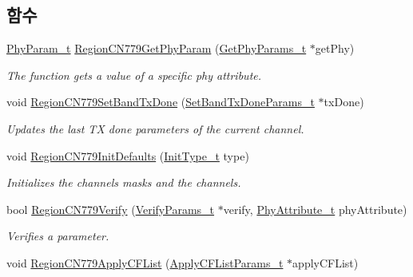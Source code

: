 \subsection*{함수}
\begin{DoxyCompactItemize}
\item 
\mbox{\hyperlink{group___r_e_g_i_o_n_gaed159b26e5c4677236b6e8677019db30}{Phy\+Param\+\_\+t}} \mbox{\hyperlink{group___r_e_g_i_o_n_c_n779_gab45c9a48b25622ab197ab8510cc7cbc0}{Region\+C\+N779\+Get\+Phy\+Param}} (\mbox{\hyperlink{group___r_e_g_i_o_n_gab471483fff904f4f89bbc03f7fc380ab}{Get\+Phy\+Params\+\_\+t}} $\ast$get\+Phy)
\begin{DoxyCompactList}\small\item\em The function gets a value of a specific phy attribute. \end{DoxyCompactList}\item 
void \mbox{\hyperlink{group___r_e_g_i_o_n_c_n779_gab7e1485f1112861ad7dae9801995a2c4}{Region\+C\+N779\+Set\+Band\+Tx\+Done}} (\mbox{\hyperlink{group___r_e_g_i_o_n_gad0524aa0673c0814a71e7a4f9cade3fc}{Set\+Band\+Tx\+Done\+Params\+\_\+t}} $\ast$tx\+Done)
\begin{DoxyCompactList}\small\item\em Updates the last TX done parameters of the current channel. \end{DoxyCompactList}\item 
void \mbox{\hyperlink{group___r_e_g_i_o_n_c_n779_ga85953f37b52567b54689c354671a14f6}{Region\+C\+N779\+Init\+Defaults}} (\mbox{\hyperlink{group___r_e_g_i_o_n_gaddc73ae10673ec925724e7870363bda9}{Init\+Type\+\_\+t}} type)
\begin{DoxyCompactList}\small\item\em Initializes the channels masks and the channels. \end{DoxyCompactList}\item 
bool \mbox{\hyperlink{group___r_e_g_i_o_n_c_n779_ga7108626b64685883842049a36d865208}{Region\+C\+N779\+Verify}} (\mbox{\hyperlink{group___r_e_g_i_o_n_ga966d97bc2f25df1c09e92e60ef652276}{Verify\+Params\+\_\+t}} $\ast$verify, \mbox{\hyperlink{group___r_e_g_i_o_n_ga9445b07fdf77581ecfaf389970e635f8}{Phy\+Attribute\+\_\+t}} phy\+Attribute)
\begin{DoxyCompactList}\small\item\em Verifies a parameter. \end{DoxyCompactList}\item 
void \mbox{\hyperlink{group___r_e_g_i_o_n_c_n779_ga7f02e6a802649d9b93c4c56eff271a26}{Region\+C\+N779\+Apply\+C\+F\+List}} (\mbox{\hyperlink{group___r_e_g_i_o_n_ga71588e9ad07e34b78fa91d51881fd3c6}{Apply\+C\+F\+List\+Params\+\_\+t}} $\ast$apply\+C\+F\+List)

\end{DoxyCompactItemize}
